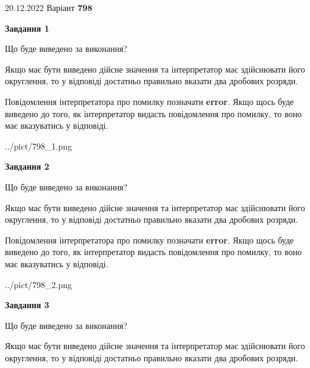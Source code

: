 \documentclass[12pt, ukrainian]{article}
\begin{document}
{20.12.2022 Варіант \No \textbf { 798 }\par}
{
\begin {Large}

{\begin {center}\textbf{Завдання 1}\end {center}}\par
Що буде виведено за виконання? \par

Якщо має бути виведено дійсне значення та інтерпретатор має здійснювати його округлення, 
то у відповіді достатньо правильно вказати два дробових розряди.

Повідомлення інтерпретатора про помилку позначати \textbf{error}.
Якщо щось буде виведено до того, як інтерпретатор видасть повідомлення про помилку, 
то воно має вказуватись у відповіді. \par

\begin{center}
	{../pict/798_1.png}
\end{center}
\newpage

{\begin {center}\textbf{Завдання 2}\end {center}}\par
Що буде виведено за виконання? \par

Якщо має бути виведено дійсне значення та інтерпретатор має здійснювати його округлення, 
то у відповіді достатньо правильно вказати два дробових розряди.

Повідомлення інтерпретатора про помилку позначати \textbf{error}.
Якщо щось буде виведено до того, як інтерпретатор видасть повідомлення про помилку, 
то воно має вказуватись у відповіді. \par

\begin{center}
	{../pict/798_2.png}
\end{center}
\newpage

{\begin {center}\textbf{Завдання 3}\end {center}}\par
Що буде виведено за виконання? \par

Якщо має бути виведено дійсне значення та інтерпретатор має здійснювати його округлення, 
то у відповіді достатньо правильно вказати два дробових розряди.


\end{Large}}
\end{document}

